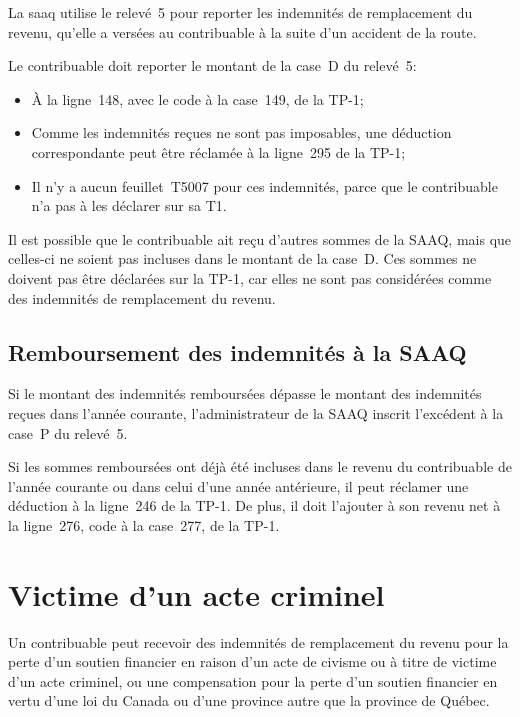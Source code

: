 La \acrfull{saaq} utilise le relevé~5 pour reporter les indemnités de remplacement du revenu, qu'elle a versées au contribuable à la suite d'un accident de la route.

Le contribuable doit reporter le montant de la case~D du relevé~5:
\begin{itemize}
	\item À la ligne~148, avec le code  \fg{} à la case~149, de la TP-1;
	\item Comme les indemnités reçues ne sont pas imposables, une déduction correspondante peut être réclamée à la ligne~295 de la TP-1;
	\item Il n'y a aucun feuillet~T5007 pour ces indemnités, parce que le contribuable n'a pas à les déclarer sur sa T1.
\end{itemize}


Il est possible que le contribuable ait reçu d'autres sommes de la SAAQ, mais que celles-ci ne soient pas incluses dans le montant de la case~D. Ces sommes ne doivent pas être déclarées sur la TP-1, car elles ne sont pas considérées comme des indemnités de remplacement du revenu.


\subsection{Remboursement des indemnités à la SAAQ}
Si le montant des indemnités remboursées dépasse le montant des indemnités reçues dans l'année courante, l'administrateur de la SAAQ inscrit l'excédent à la case~P du relevé~5. 

Si les sommes remboursées ont déjà été incluses dans le revenu du contribuable de l'année courante ou dans celui d'une année antérieure, il peut réclamer une déduction à la ligne~246 de la TP-1. De plus, il doit l'ajouter à son revenu net à la ligne~276, code  \fg{} à la case~277, de la TP-1.



\section{Victime d'un acte criminel}
\begin{intro}
	Un contribuable peut recevoir des indemnités de remplacement du revenu pour la perte d'un soutien financier en raison d'un acte de civisme ou à titre de victime d'un acte criminel, ou une compensation pour la perte d'un soutien financier en vertu d'une loi du Canada ou d'une province autre que la province de Québec. 
\end{intro}

